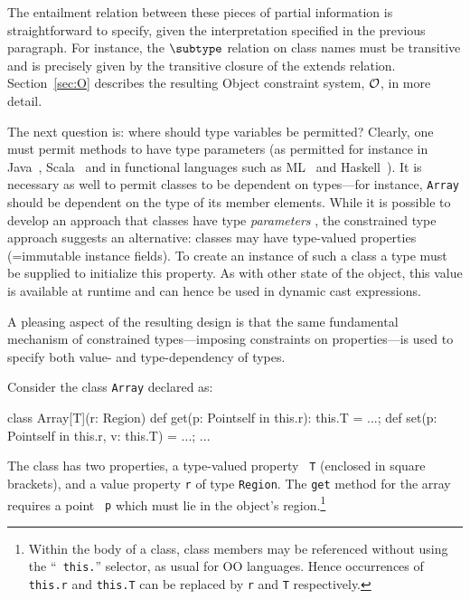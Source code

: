 The entailment relation between these pieces of partial information is
straightforward to specify, given the interpretation specified in the
previous paragraph. For instance, the $\subtype$ relation on class
names must be transitive and is precisely given by the transitive
closure of the extends relation.
Section~\ref{sec:O} describes the
resulting Object constraint system, $\cal O$, in more detail.

The next question is: where should type variables be permitted?
Clearly, one must permit methods to have type parameters (as permitted
for instance in Java~\cite{Java3}, Scala~\cite{scala} and in
functional languages such as ML~\cite{ml} and Haskell~\cite{haskell}).
It is necessary as well to permit classes to be dependent on types---for
instance, {\tt Array} should be dependent on the type of its
member elements. While it is possible to develop an approach that
classes have type {\em parameters} \cite{Java3}, the constrained
type approach suggests an alternative: classes may have type-valued
properties (=immutable instance fields). To create an instance of such
a class a type must be supplied to initialize this property. As with
other state of the object, this value is available at runtime and
can hence be used in dynamic cast expressions.

A pleasing aspect of the resulting design is that the same fundamental
mechanism of constrained types---imposing constraints on properties---is
used to specify both value- and type-dependency of types.

\begin{example}[Array]
  Consider the class {\tt Array} declared as:
{\footnotesize
\begin{xten}
class Array[T](r: Region) {
  def get(p: Point{self in this.r}): this.T = ...;
  def set(p: Point{self in this.r}, v: this.T) = ...;
  ...
}
\end{xten}}
{}\noindent The class has two properties, a type-valued property {\tt
T} (enclosed in square brackets), and a value property {\tt r} of type
{\tt Region}. The {\tt get} method for the array requires a point {\tt
p} which must lie in the object's region.\footnote{Within the body of
a class, class members may be referenced without using the ``{\tt
this.}'' selector, as usual for OO languages. Hence occurrences of
{\tt this.r} and {\tt this.T} can be replaced by {\tt r} and {\tt T}
respectively.}
\end{example}

